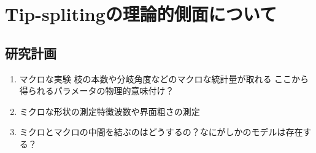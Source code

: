 \documentclass{ltjsarticle}
\begin{document}
\section{Tip-splitingの理論的側面について}
\subsection{研究計画}
\begin{enumerate}
  \item マクロな実験 \rightarrow 枝の本数や分岐角度などのマクロな統計量が取れる \rightarrow ここから得られるパラメータの物理的意味付け？
  \item ミクロな形状の測定\cite{schilardi2000stable}\rightarrow 特徴波数や界面粗さの測定
  \item ミクロとマクロの中間を結ぶのはどうするの？\rightarrow なにがしかのモデルは存在する？
\end{enumerate}


\end{document}
